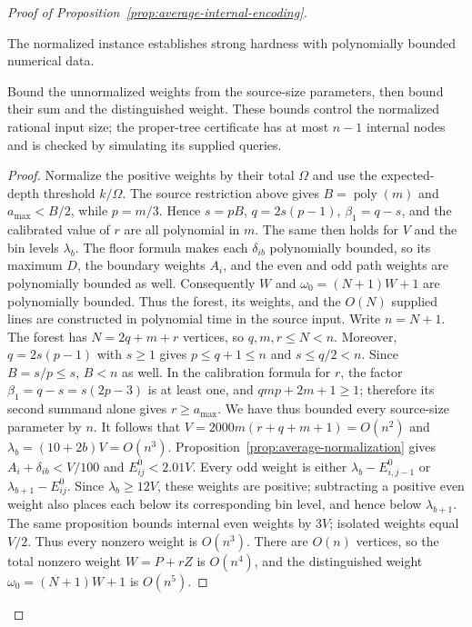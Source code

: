 \begin{proof}[Proof of Proposition~\ref{prop:average-internal-encoding}]
\begin{claim}
The normalized instance establishes strong hardness with polynomially
bounded numerical data.
\end{claim}
\begin{proofstrategy}
Bound the unnormalized weights from the source-size parameters, then
bound their sum and the distinguished weight. These bounds control the
normalized rational input size; the proper-tree certificate has at
most $n-1$ internal nodes and is checked by simulating its supplied
queries.
\end{proofstrategy}
\begin{proof}
Normalize the positive weights by their total $\Omega$ and use
the expected-depth threshold $k/\Omega$.
The source restriction above gives $B=\operatorname{poly}(m)$ and
$a_{\max}<B/2$, while $p=m/3$. Hence $s=pB$, $q=2s(p-1)$,
$\beta_1=q-s$, and the calibrated value of $r$ are all polynomial in
$m$. The same then holds for $V$ and the bin levels $\lambda_b$. The
floor formula makes each $\delta_{ib}$ polynomially bounded, so its
maximum $D$, the boundary weights $A_i$, and the even and odd path
weights are polynomially bounded as well. Consequently $W$ and
$\omega_0=(N+1)W+1$ are polynomially bounded. Thus the forest, its
weights, and the $O(N)$ supplied lines are constructed in polynomial
time in the source input.
Write $n=N+1$. The forest has $N=2q+m+r$ vertices, so
$q,m,r\le N<n$. Moreover, $q=2s(p-1)$ with $s\ge1$ gives
$p\le q+1\le n$ and $s\le q/2<n$. Since $B=s/p\le s$,
$B<n$ as well. In the calibration formula for $r$, the factor
$\beta_1=q-s=s(2p-3)$ is at least one, and $qmp+2m+1\ge1$;
therefore its second summand alone gives $r\ge a_{\max}$. We have
thus bounded every source-size parameter by $n$. It follows that
$V=2000m(r+q+m+1)=O(n^2)$ and
$\lambda_b=(10+2b)V=O(n^3)$. Proposition~\ref{prop:average-normalization}
gives $A_i+\delta_{ib}<V/100$ and $E^0_{ij}<2.01V$. Every odd
weight is either $\lambda_b-E^0_{i,j-1}$ or
$\lambda_{b+1}-E^0_{ij}$. Since $\lambda_b\ge12V$, these weights
are positive; subtracting a positive even weight also places each
below its corresponding bin level, and hence below $\lambda_{b+1}$.
The same proposition bounds internal even weights by $3V$; isolated
weights equal $V/2$. Thus every nonzero weight is $O(n^3)$. There are
$O(n)$ vertices, so the total nonzero
weight $W=P+rZ$ is $O(n^4)$, and the distinguished weight
$\omega_0=(N+1)W+1$ is $O(n^5)$.


\end{proof}
\end{proof}
